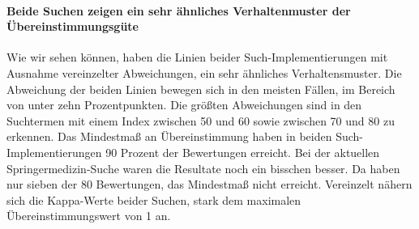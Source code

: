 \paragraph{Beide Suchen zeigen ein sehr ähnliches Verhaltenmuster der Übereinstimmungsgüte} Wie wir sehen können, haben die Linien beider Such-Implementierungen mit Ausnahme vereinzelter Abweichungen, ein sehr ähnliches Verhaltensmuster. Die Abweichung der beiden Linien bewegen sich in den meisten Fällen, im Bereich von unter zehn Prozentpunkten. Die größten Abweichungen sind in den Suchtermen mit einem Index zwischen 50 und 60 sowie zwischen 70 und 80 zu erkennen. Das Mindestmaß an Übereinstimmung haben in beiden Such-Implementierungen 90 Prozent der Bewertungen erreicht. Bei der aktuellen Springermedizin-Suche waren die Resultate noch ein bisschen besser. Da haben nur sieben der 80 Bewertungen, das Mindestmaß nicht erreicht. Vereinzelt nähern sich die Kappa-Werte beider Suchen, stark dem maximalen Übereinstimmungswert von 1 an. 
